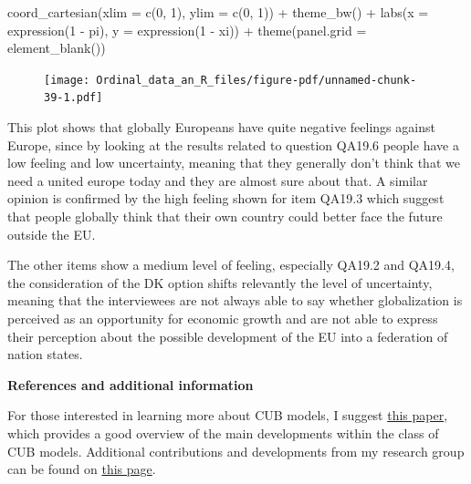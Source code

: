 \documentclass[
  letterpaper,
  DIV=11,
  numbers=noendperiod]{scrartcl}
\newenvironment{Shaded}{\begin{snugshade}}{\end{snugshade}}
\newcommand{\AttributeTok}[1]{\textcolor[rgb]{0.40,0.45,0.13}{#1}}
\newcommand{\DecValTok}[1]{\textcolor[rgb]{0.68,0.00,0.00}{#1}}
\newcommand{\FunctionTok}[1]{\textcolor[rgb]{0.28,0.35,0.67}{#1}}
\newcommand{\NormalTok}[1]{\textcolor[rgb]{0.00,0.23,0.31}{#1}}
\newcommand{\SpecialCharTok}[1]{\textcolor[rgb]{0.37,0.37,0.37}{#1}}
\begin{document}
\begin{Shaded}
\begin{Highlighting}[]
  \FunctionTok{coord\_cartesian}\NormalTok{(}\AttributeTok{xlim =} \FunctionTok{c}\NormalTok{(}\DecValTok{0}\NormalTok{, }\DecValTok{1}\NormalTok{), }\AttributeTok{ylim =} \FunctionTok{c}\NormalTok{(}\DecValTok{0}\NormalTok{, }\DecValTok{1}\NormalTok{)) }\SpecialCharTok{+}
  \FunctionTok{theme\_bw}\NormalTok{() }\SpecialCharTok{+}
  \FunctionTok{labs}\NormalTok{(}\AttributeTok{x =} \FunctionTok{expression}\NormalTok{(}\DecValTok{1} \SpecialCharTok{{-}}\NormalTok{ pi), }\AttributeTok{y =} \FunctionTok{expression}\NormalTok{(}\DecValTok{1} \SpecialCharTok{{-}}\NormalTok{ xi)) }\SpecialCharTok{+}
  \FunctionTok{theme}\NormalTok{(}\AttributeTok{panel.grid =} \FunctionTok{element\_blank}\NormalTok{())}
\end{Highlighting}
\end{Shaded}

\begin{figure}[H]

{\centering \texttt{[image: Ordinal\_data\_an\_R\_files/figure-pdf/unnamed-chunk-39-1.pdf]}

}

\end{figure}

This plot shows that globally Europeans have quite negative feelings
against Europe, since by looking at the results related to question
QA19.6 people have a low feeling and low uncertainty, meaning that they
generally don't think that we need a united europe today and they are
almost sure about that. A similar opinion is confirmed by the high
feeling shown for item QA19.3 which suggest that people globally think
that their own country could better face the future outside the EU.

The other items show a medium level of feeling, especially QA19.2 and
QA19.4, the consideration of the DK option shifts relevantly the level
of uncertainty, meaning that the interviewees are not always able to say
whether globalization is perceived as an opportunity for economic growth
and are not able to express their perception about the possible
development of the EU into a federation of nation states.

\textbf{References and additional information}

For those interested in learning more about CUB models, I suggest
\href{https://link.springer.com/article/10.1007/s10260-019-00461-1}{this
paper}, which provides a good overview of the main developments within
the class of CUB models. Additional contributions and developments from
my research group can be found on
\href{https://bodai.unibs.it/cub/}{this page}.
\end{document}
